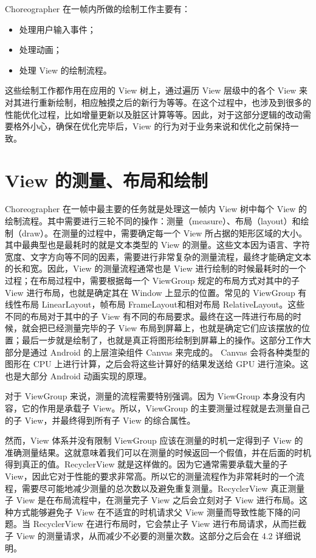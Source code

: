 Choreographer 在一帧内所做的绘制工作主要有：

\begin{itemize}
    \item 处理用户输入事件；
    \item 处理动画；
    \item 处理 View 的绘制流程。
\end{itemize}

这些绘制工作都作用在应用的 View 树上，通过遍历 View 层级中的各个 View 来对其进行重新绘制，相应触摸之后的新行为等等。在这个过程中，也涉及到很多的性能优化过程，比如增量更新以及脏区计算等等。因此，对于这部分逻辑的改动需要格外小心，确保在优化完毕后，View 的行为对于业务来说和优化之前保持一致。

\section{View 的测量、布局和绘制}

Choreographer 在一帧中最主要的任务就是处理这一帧内 View 树中每个 View 的绘制流程。其中需要进行三轮不同的操作：测量（measure）、布局（layout）和绘制（draw）。\cite{rountev2014static}在测量的过程中，需要确定每一个 View 所占据的矩形区域的大小。其中最典型也是最耗时的就是文本类型的 View 的测量。这些文本因为语言、字符宽度、文字方向等不同的因素，需要进行非常复杂的测量流程，最终才能确定文本的长和宽。因此，View 的测量流程通常也是 View 进行绘制的时候最耗时的一个过程；在布局过程中，需要根据每一个 ViewGroup 规定的布局方式对其中的子 View 进行布局，也就是确定其在 Window 上显示的位置。常见的 ViewGroup 有线性布局 LinearLayout，帧布局 FrameLayout和相对布局 RelativeLayout。这些不同的布局对于其中的子 View 有不同的布局要求。最终在这一阵进行布局的时候，就会把已经测量完毕的子 View 布局到屏幕上，也就是确定它们应该摆放的位置；最后一步就是绘制了，也就是真正将图形绘制到屏幕上的操作。这部分工作大部分是通过 Android 的上层渲染组件 Canvas 来完成的。 Canvas 会将各种类型的图形在 CPU 上进行计算，之后会将这些计算好的结果发送给 GPU 进行渲染。这也是大部分 Android 动画实现的原理。

对于 ViewGroup 来说，测量的流程需要特别强调。因为 ViewGroup 本身没有内容，它的作用是承载子 View。所以，ViewGroup 的主要测量过程就是去测量自己的子 View，并最终得到所有子 View 的综合属性。

然而，View 体系并没有限制 ViewGroup 应该在测量的时机一定得到子 View 的准确测量结果。这就意味着我们可以在测量的时候返回一个假值，并在后面的时机得到真正的值。RecyclerView 就是这样做的。因为它通常需要承载大量的子 View，因此它对于性能的要求非常高。所以它的测量流程作为非常耗时的一个流程，需要尽可能地减少测量的总次数以及避免重复测量。RecyclerView 真正测量子 View 是在布局流程中，在测量完子 View 之后会立刻对子 View 进行布局。这种方式能够避免子 View 在不适宜的时机请求父 View 测量而导致性能下降的问题。当 RecyclerView 在进行布局时，它会禁止子 View 进行布局请求，从而拦截子 View 的测量请求，从而减少不必要的测量次数。这部分之后会在 4.2 详细说明。

